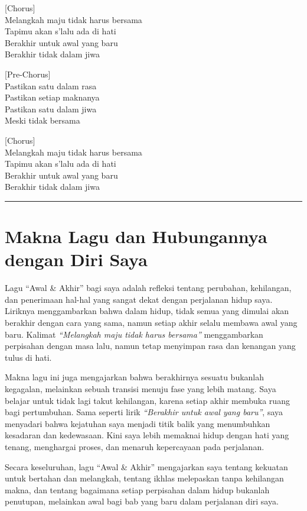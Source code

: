 \documentclass[
  letterpaper,
  DIV=11,
  numbers=noendperiod]{scrreprt}
\begin{document}
{[}Chorus{]}\\
Melangkah maju tidak harus bersama\\
Tapimu akan s'lalu ada di hati\\
Berakhir untuk awal yang baru\\
Berakhir tidak dalam jiwa

{[}Pre-Chorus{]}\\
Pastikan satu dalam rasa\\
Pastikan setiap maknanya\\
Pastikan satu dalam jiwa\\
Meski tidak bersama

{[}Chorus{]}\\
Melangkah maju tidak harus bersama\\
Tapimu akan s'lalu ada di hati\\
Berakhir untuk awal yang baru\\
Berakhir tidak dalam jiwa

\begin{center}\rule{0.5\linewidth}{0.5pt}\end{center}

\section{Makna Lagu dan Hubungannya dengan Diri
Saya}\label{makna-lagu-dan-hubungannya-dengan-diri-saya}

Lagu ``Awal \& Akhir'' bagi saya adalah refleksi tentang perubahan,
kehilangan, dan penerimaan hal-hal yang sangat dekat dengan perjalanan
hidup saya. Liriknya menggambarkan bahwa dalam hidup, tidak semua yang
dimulai akan berakhir dengan cara yang sama, namun setiap akhir selalu
membawa awal yang baru. Kalimat \emph{``Melangkah maju tidak harus
bersama''} menggambarkan perpisahan dengan masa lalu, namun tetap
menyimpan rasa dan kenangan yang tulus di hati.

Makna lagu ini juga mengajarkan bahwa berakhirnya sesuatu bukanlah
kegagalan, melainkan sebuah transisi menuju fase yang lebih matang. Saya
belajar untuk tidak lagi takut kehilangan, karena setiap akhir membuka
ruang bagi pertumbuhan. Sama seperti lirik \emph{``Berakhir untuk awal
yang baru''}, saya menyadari bahwa kejatuhan saya menjadi titik balik
yang menumbuhkan kesadaran dan kedewasaan. Kini saya lebih memaknai
hidup dengan hati yang tenang, menghargai proses, dan menaruh
kepercayaan pada perjalanan.

Secara keseluruhan, lagu ``Awal \& Akhir'' mengajarkan saya tentang
kekuatan untuk bertahan dan melangkah, tentang ikhlas melepaskan tanpa
kehilangan makna, dan tentang bagaimana setiap perpisahan dalam hidup
bukanlah penutupan, melainkan awal bagi bab yang baru dalam perjalanan
diri saya.
\end{document}
